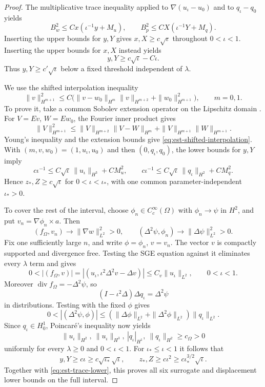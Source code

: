 \documentclass[11pt,a4paper]{article}
\theoremstyle{remark}
\numberwithin{equation}{section}
\begin{document}
\begin{proof}
The multiplicative trace inequality applied to
$\nabla(u_\iota-u_0)$ and to $q_\iota-q_0$ yields
\begin{equation}\label{eq:est-trace-lower}
 B_w^2\le Cx(\iota^{-1}y+M_u),
 \qquad B_p^2\le CX(\iota^{-1}Y+M_q).
\end{equation}
Inserting the upper bounds for $y,Y$ gives
$x,X\ge c\sqrt\iota$ throughout $0<\iota<1$.
Inserting the upper bounds for $x,X$ instead yields
\[
 y,Y\ge c\sqrt\iota-C\iota.
\]
Thus $y,Y\ge c'\sqrt\iota$ below a fixed threshold independent of
$\lambda$.

We use the shifted interpolation inequality
\begin{equation}\label{eq:est-shifted-interpolation}
 \|v\|_{H^{m+1}}^2
 \le C\bigl(\|v-w_0\|_{H^m}\|v\|_{H^{m+2}}
                      +\|w_0\|_{H^{m+1}}^2\bigr),\qquad m=0,1.
\end{equation}
To prove it, take a common Sobolev extension operator on the Lipschitz
domain \cite{Stein1970}. For $V=Ev$, $W=Ew_0$, the Fourier inner
product gives
\[
 \|V\|_{H^{m+1}}^2
 \le\|V\|_{H^{m+2}}\|V-W\|_{H^m}
                  +\|V\|_{H^{m+1}}\|W\|_{H^{m+1}}.
\]
Young's inequality and the extension bounds give
\eqref{eq:est-shifted-interpolation}.
With $(m,v,w_0)=(1,u_\iota,u_0)$ and then
$(0,q_\iota,q_0)$, the lower bounds for $y,Y$ imply
\[
 c\iota^{-1}\le C\sqrt\iota\,\|u_\iota\|_{H^3}+CM_u^2,
 \qquad
 c\iota^{-1}\le C\sqrt\iota\,\|q_\iota\|_{H^2}+CM_q^2.
\]
Hence $z_*,Z\ge c\sqrt\iota$ for
$0<\iota<\iota_*$, with one common parameter-independent
$\iota_*>0$.

To cover the rest of the interval, choose
$\phi_n\in C_c^\infty(\Omega)$ with $\phi_n\to\psi$ in $H^2$, and
put $v_n=\nabla\phi_n\times a$. Then
\[
 (f_\Omega,v_n)\longrightarrow\|\nabla w\|_{L^2}^2>0,
 \qquad
 (\Delta^2\psi,\phi_n)\longrightarrow\|\Delta\psi\|_{L^2}^2>0.
\]
Fix one sufficiently large $n$, and write $\phi=\phi_n$, $v=v_n$.
The vector $v$ is compactly supported and divergence free. Testing the
SGE equation against it eliminates every $\lambda$ term and gives
\[
 0<|(f_\Omega,v)|
 =|(u_\iota,\iota^2\Delta^2v-\Delta v)|
 \le C_v\|u_\iota\|_{L^2},\qquad 0<\iota<1.
\]
Moreover $\operatorname{div}f_\Omega=-\Delta^2\psi$, so
\[
 (I-\iota^2\Delta)\Delta q_\iota=\Delta^2\psi
\]
in distributions. Testing with the fixed $\phi$ gives
\[
 0<|(\Delta^2\psi,\phi)|
 \le(\|\Delta\phi\|_{L^2}+\|\Delta^2\phi\|_{L^2})
                  \|q_\iota\|_{L^2}.
\]
Since $q_\iota\in H_0^1$, Poincar\'e's inequality now yields
\[
 \|u_\iota\|_{H^2},\ \|u_\iota\|_{H^3},\
 |q_\iota|_{H^1},\ \|q_\iota\|_{H^2}\ge c_\Omega>0
\]
uniformly for every $\lambda\ge0$ and $0<\iota<1$.
For $\iota_*\le\iota<1$ it follows that
\[
 y,Y\ge c\iota\ge c\sqrt{\iota_*}\sqrt\iota,
 \qquad
 z_*,Z\ge c\iota^2\ge c\iota_*^{3/2}\sqrt\iota.
\]
Together with \eqref{eq:est-trace-lower}, this proves all six surrogate
and displacement lower bounds on the full interval.


\end{proof}
\end{document}
